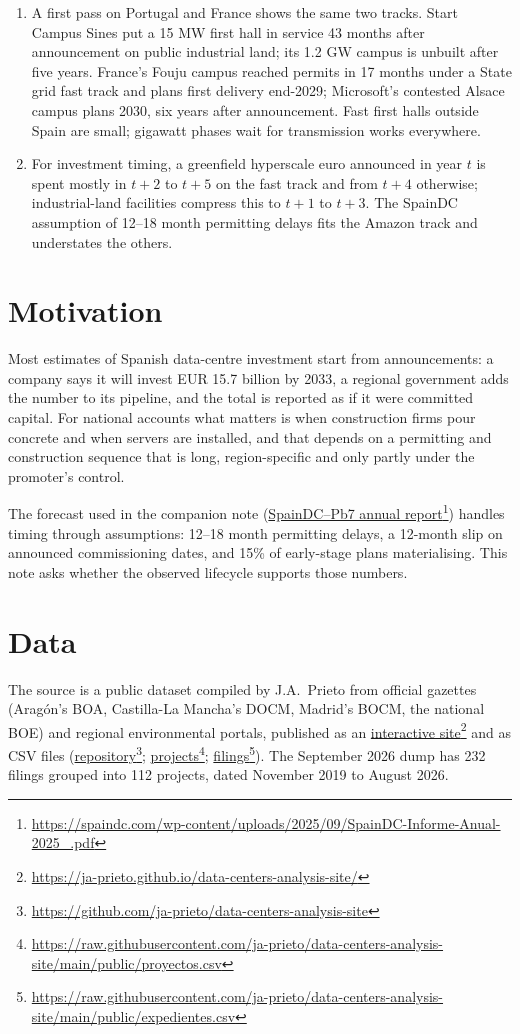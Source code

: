 \documentclass[11pt]{article}
\newcommand{\src}[2]{\href{#1}{#2}\footnote{\url{#1}}}
\begin{document}
\begin{enumerate}[leftmargin=*]
\item A first pass on Portugal and France shows the same two tracks. Start Campus Sines put a 15 MW first hall in service 43 months after announcement on public industrial land; its 1.2 GW campus is unbuilt after five years. France's Fouju campus reached permits in 17 months under a State grid fast track and plans first delivery end-2029; Microsoft's contested Alsace campus plans 2030, six years after announcement. Fast first halls outside Spain are small; gigawatt phases wait for transmission works everywhere.
\item For investment timing, a greenfield hyperscale euro announced in year $t$ is spent mostly in $t+2$ to $t+5$ on the fast track and from $t+4$ otherwise; industrial-land facilities compress this to $t+1$ to $t+3$. The SpainDC assumption of 12--18 month permitting delays fits the Amazon track and understates the others.
\end{enumerate}

\section{Motivation}

Most estimates of Spanish data-centre investment start from announcements: a company says it will invest EUR 15.7 billion by 2033, a regional government adds the number to its pipeline, and the total is reported as if it were committed capital. For national accounts what matters is when construction firms pour concrete and when servers are installed, and that depends on a permitting and construction sequence that is long, region-specific and only partly under the promoter's control.

The forecast used in the companion note (\src{https://spaindc.com/wp-content/uploads/2025/09/SpainDC-Informe-Anual-2025_.pdf}{SpainDC--Pb7 annual report}) handles timing through assumptions: 12--18 month permitting delays, a 12-month slip on announced commissioning dates, and 15\% of early-stage plans materialising. This note asks whether the observed lifecycle supports those numbers.

\section{Data}

The source is a public dataset compiled by J.A.~Prieto from official gazettes (Aragón's BOA, Castilla-La Mancha's DOCM, Madrid's BOCM, the national BOE) and regional environmental portals, published as an \src{https://ja-prieto.github.io/data-centers-analysis-site/}{interactive site} and as CSV files (\src{https://github.com/ja-prieto/data-centers-analysis-site}{repository}; \src{https://raw.githubusercontent.com/ja-prieto/data-centers-analysis-site/main/public/proyectos.csv}{projects}; \src{https://raw.githubusercontent.com/ja-prieto/data-centers-analysis-site/main/public/expedientes.csv}{filings}). The September 2026 dump has 232 filings grouped into 112 projects, dated November 2019 to August 2026.
\end{document}
